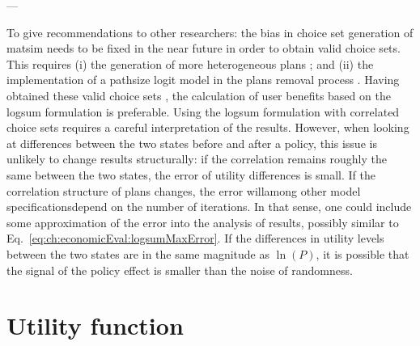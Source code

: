 ---

To give recommendations to other researchers: the bias in choice set generation of \gls{matsim} needs to be fixed in the near future in order to obtain valid choice sets.
%
This requires (i) the generation of more heterogeneous plans \citep[see, e.g.,][for such attempts in the \acrshort{pt} and in the car mode, respectively]{Moyo2013PhD, NagelKickhoeferJoubert2014HeterogeneousVoTsPROCEDIA}; and (ii) the implementation of a pathsize logit model in the plans removal process \citep[see, e.g.,][]{Grether2014PhD}.
%
Having obtained these valid choice sets \citep{NagelFloetteroed2009IatbrResourceInBook}, the calculation of user benefits based on the logsum formulation is preferable.
%
%
Using the logsum formulation with correlated choice sets requires a careful interpretation of the results. However, when looking at differences between the two states before and after a policy, this issue is unlikely to change results structurally: if the correlation remains roughly the same between the two states, the error of utility differences is small. If the correlation structure of plans changes, the error will\textemdash among other model specifications\textemdash depend on the number of iterations.
%
%
In that sense, one could include some approximation of the error into the analysis of results, possibly similar to Eq.~\ref{eq:ch:economicEval:logsumMaxError}. If the differences in utility levels between the two states are in the same magnitude as $\ln(P)$, it is possible that the signal of the policy effect is smaller than the noise of randomness.

\section{Utility function}
\label{sec:future-of-scoring-function}


